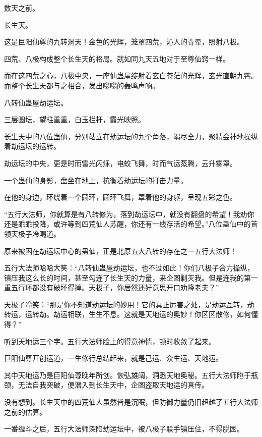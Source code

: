 
\begin{this_body}

数天之前。

长生天。

这是巨阳仙尊的九转洞天！金色的光辉，笼罩四荒，沁人的青晕，照射八极。

四荒、八极构成整个长生天的格局。就如同九天五地对于至尊仙窍一样。

而在这四荒之心，八极中央，一座仙蛊屋绽射着玄白苍茫的光辉，玄光直朝九霄。而整个长生天都与之相合，发出嗡嗡的轰鸣声响。

八转仙蛊屋劫运坛。

三层圆坛，望柱重重，白玉栏杆，霞光映照。

长生天中的八位蛊仙，分别站立在劫运坛的九个角落，竭尽全力，聚精会神地操纵着劫运坛的运转。

劫运坛的中央，更是时而雷光闪烁，电蛟飞舞，时而气运蒸腾，云升雾罩。

一个蛊仙的身影，盘坐在地上，抗衡着劫运坛的打击力量。

在他的身边，环绕着一个圆环，圆环飞舞，罩着他的身躯，呈现五彩之色。

“五行大法师，你就算是有八转修为，落到劫运坛中，就没有翻盘的希望！我劝你还是乖乖投降，或许等到四荒仙人苏醒，你还有一线存活的希望。”八位蛊仙中的首领天极子冷喝道。

原来被困在劫运坛中心的蛊仙，正是北原五大八转的存在之一五行大法师！

五行大法师哈哈大笑：“八转仙蛊屋劫运坛，也不过如此！你们八极子合力操纵，镇压我这么长的时间，甚至勾连了长生天的力量，来企图剿灭我。但是连我的第一重五行环都没有破坏得掉。天极子，你居然还好意思开口劝降老夫？”

天极子冷笑：“那是你不知道劫运坛的妙用！它的真正厉害之处，是劫运互转，劫转运，运转劫。劫运相联，生生不息。这就是天地运的奥妙！你区区散修，如何懂得？”

听到天地运三个字。五行大法师脸上的得意神情，顿时收敛了起来。

巨阳仙尊开创运道，一生修行总结起来，就是己运、众生运、天地运。

其中天地运乃是巨阳仙尊晚年所创。恢弘雄阔，洞悉天地奥秘。五行大法师陷于瓶颈，无法自我突破，便潜入到长生天中，企图盗取天地运的真传。

没有想到。长生天中的四荒仙人虽然皆是沉眠，但防御力量仍旧超越了五行大法师之前的估算。

一番缠斗之后，五行大法师深陷劫运坛中，被八极子联手镇压住，不得脱困。


\end{this_body}
